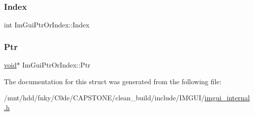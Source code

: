 \subsubsection{\texorpdfstring{Index}{Index}}
{\footnotesize\ttfamily int Im\+Gui\+Ptr\+Or\+Index\+::\+Index}

\mbox{\label{structImGuiPtrOrIndex_a9171d3539aed08cc1ffd543c63ce2891}} 
\subsubsection{\texorpdfstring{Ptr}{Ptr}}
{\footnotesize\ttfamily \hyperlink{imgui__impl__opengl3__loader_8h_ac668e7cffd9e2e9cfee428b9b2f34fa7}{void}$\ast$ Im\+Gui\+Ptr\+Or\+Index\+::\+Ptr}



The documentation for this struct was generated from the following file\+:\begin{DoxyCompactItemize}
\item 
/mnt/hdd/fnky/\+C0de/\+C\+A\+P\+S\+T\+O\+N\+E/clean\+\_\+build/include/\+I\+M\+G\+U\+I/\hyperlink{imgui__internal_8h}{imgui\+\_\+internal.\+h}\end{DoxyCompactItemize}
